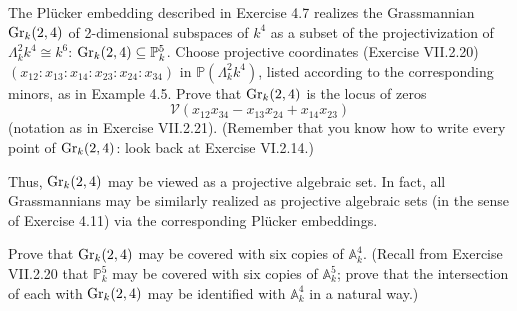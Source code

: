 \documentclass[../../master.tex]{subfiles}
\begin{document}
\begin{problem}
    The Pl\"ucker embedding described in Exercise 4.7 realizes the Grassmannian $\operatorname{Gr}_k(2, 4)$ of 2-dimensional subspaces of $k^{4}$ as a subset of the projectivization of $\Lambda_k^{2} k^{4} \cong k^{6}$: $\operatorname{Gr}_k(2, 4) \subseteq \mathbb{P}_k^{5}$.
    Choose projective coordinates (Exercise VII.2.20) $(x_{12} : x_{13} : x_{14} : x_{23} : x_{24} : x_{34})$ in $\mathbb{P}(\Lambda_k^{2} k^{4})$, listed according to the corresponding minors, as in Example 4.5.
    Prove that $\operatorname{Gr}_k(2, 4)$ is the locus of zeros
    \[
    \mathscr{V}(x_{12} x_{34} - x_{13} x_{24} + x_{14} x_{23})
    \]
    (notation as in Exercise VII.2.21).
    (Remember that you know how to write every point of $\operatorname{Gr}_k(2, 4)$: look back at Exercise VI.2.14.)

    Thus, $\operatorname{Gr}_k(2, 4)$ may be viewed as a projective algebraic set.
    In fact, all Grassmannians may be similarly realized as projective algebraic sets (in the sense of Exercise 4.11) via the corresponding Pl\"ucker embeddings.

    Prove that $\operatorname{Gr}_k(2, 4)$ may be covered with six copies of $\mathbb{A}_k^{4}$.
    (Recall from Exercise VII.2.20 that $\mathbb{P}_k^{5}$ may be covered with six copies of $\mathbb{A}_k^{5}$;
    prove that the intersection of each with $\operatorname{Gr}_k(2, 4)$ may be identified with $\mathbb{A}_k^{4}$ in a natural way.)
\end{problem}
\end{document}
